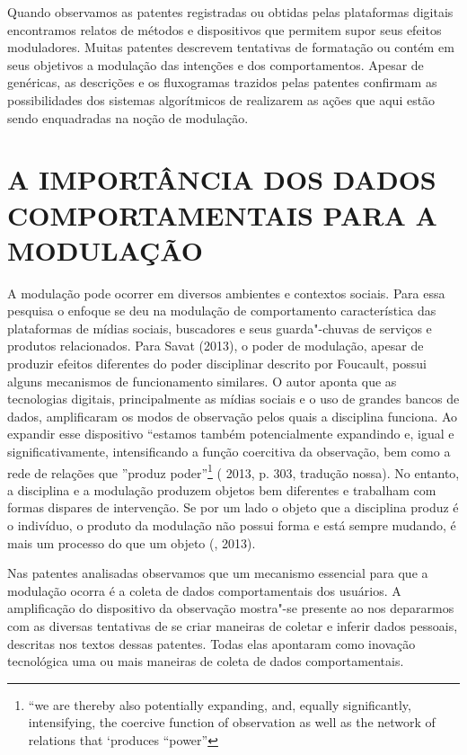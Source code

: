 Quando observamos as patentes registradas ou obtidas pelas plataformas
digitais encontramos relatos de métodos e dispositivos que permitem
supor seus efeitos moduladores. Muitas patentes descrevem tentativas de
formatação ou contém em seus objetivos a modulação das intenções e dos
comportamentos. Apesar de genéricas, as descrições e os fluxogramas
trazidos pelas patentes confirmam as possibilidades dos sistemas
algorítmicos de realizarem as ações que aqui estão sendo enquadradas na
noção de modulação.

\section{A IMPORTÂNCIA DOS DADOS COMPORTAMENTAIS PARA A MODULAÇÃO}

A modulação pode ocorrer em diversos ambientes e contextos sociais. Para
essa pesquisa o enfoque se deu na modulação de comportamento
característica das plataformas de mídias sociais, buscadores e seus
guarda"-chuvas de serviços e produtos relacionados. Para Savat (2013), o
poder de modulação, apesar de produzir efeitos diferentes do poder
disciplinar descrito por Foucault, possui alguns mecanismos de
funcionamento similares. O autor aponta que as tecnologias digitais,
principalmente as mídias sociais e o uso de grandes bancos de dados,
amplificaram os modos de observação pelos quais a disciplina funciona.
Ao expandir esse dispositivo ``estamos também potencialmente expandindo
e, igual e significativamente, intensificando a função coercitiva da
observação, bem como a rede de relações que ''produz poder''\footnote{``we
  are thereby also potentially expanding, and, equally significantly,
  intensifying, the coercive function of observation as well as the
  network of relations that `produces ``power''} ( 2013, p. 303,
tradução nossa). No entanto, a disciplina e a modulação produzem objetos
bem diferentes e trabalham com formas dispares de intervenção. Se por um
lado o objeto que a disciplina produz é o indivíduo, o produto da
modulação não possui forma e está sempre mudando, é mais um processo do
que um objeto (, 2013).

Nas patentes analisadas observamos que um mecanismo essencial para que a
modulação ocorra é a coleta de dados comportamentais dos usuários. A
amplificação do dispositivo da observação mostra"-se presente ao nos
depararmos com as diversas tentativas de se criar maneiras de coletar e
inferir dados pessoais, descritas nos textos dessas patentes. Todas elas
apontaram como inovação tecnológica uma ou mais maneiras de coleta de
dados comportamentais.

